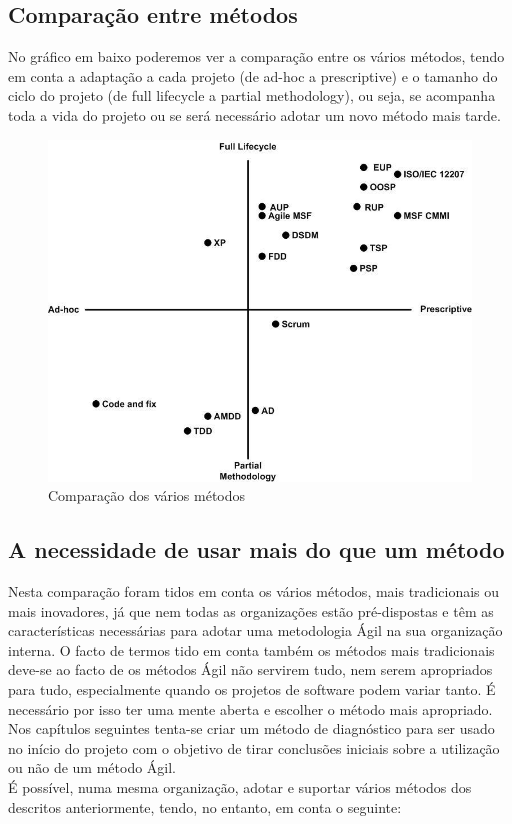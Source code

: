 \subsection{Comparação entre métodos}

No gráfico em baixo poderemos ver a comparação entre os vários métodos, tendo em conta a adaptação a cada projeto (de ad-hoc a prescriptive) e o tamanho do ciclo do projeto (de full lifecycle a partial methodology), ou seja, se acompanha toda a vida do projeto ou se será necessário adotar um novo método mais tarde. 

\begin{figure}[H]
    \centering
    \includegraphics[scale=0.5]{Imagens/processComparisons.jpg}
    \caption{Comparação dos vários métodos}
    \label{fig:compme}
\end{figure}


\subsection{A necessidade de usar mais do que um método}

Nesta comparação foram tidos em conta os vários métodos, mais tradicionais ou mais inovadores, já que nem todas as organizações estão pré-dispostas e têm as características necessárias para adotar uma metodologia Ágil na sua organização interna. O facto de termos tido em conta também os métodos mais tradicionais deve-se ao facto de os métodos Ágil não servirem tudo, nem serem apropriados para tudo, especialmente quando os projetos de software podem variar tanto. É necessário por isso ter uma mente aberta e escolher o método mais apropriado. Nos capítulos seguintes tenta-se criar um método de diagnóstico para ser usado no início do projeto com o objetivo de tirar conclusões iniciais sobre a utilização ou não de um método Ágil.
\\É possível, numa mesma organização, adotar e suportar vários métodos dos descritos anteriormente, tendo, no entanto, em conta o seguinte:

